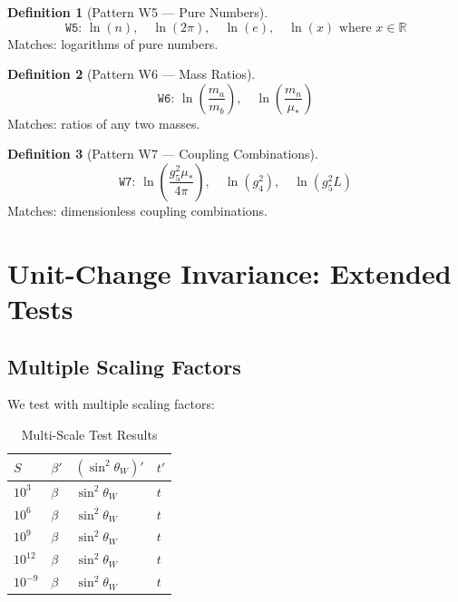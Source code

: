 \documentclass[11pt,a4paper]{article}
\theoremstyle{definition}
\newtheorem{definition}{Definition}[section]
\begin{document}
\begin{definition}[Pattern W5 — Pure Numbers]
\label{def:w5}
\begin{equation}
\label{eq:w5_regex}
\texttt{W5: } \ln(n), \quad \ln(2\pi), \quad \ln(e), \quad \ln(x) \text{ where } x \in \mathbb{R}
\end{equation}
Matches: logarithms of pure numbers.
\end{definition}

\begin{definition}[Pattern W6 — Mass Ratios]
\label{def:w6}
\begin{equation}
\label{eq:w6_regex}
\texttt{W6: } \ln\left(\frac{m_a}{m_b}\right), \quad \ln\left(\frac{m_n}{\mu_*}\right)
\end{equation}
Matches: ratios of any two masses.
\end{definition}

\begin{definition}[Pattern W7 — Coupling Combinations]
\label{def:w7}
\begin{equation}
\label{eq:w7_regex}
\texttt{W7: } \ln\left(\frac{g_5^2 \mu_*}{4\pi}\right), \quad \ln(g_4^2), \quad \ln(g_5^2 L)
\end{equation}
Matches: dimensionless coupling combinations.
\end{definition}

\section{Unit-Change Invariance: Extended Tests}
\label{app:unit_extended}

\subsection{Multiple Scaling Factors}
\label{subsec:multi_scale}

We test with multiple scaling factors:

\begin{table}[h]
\centering
\caption{Multi-Scale Test Results}
\label{tab:multi_scale}
\begin{tabular}{@{}llll@{}}
\toprule
\textbf{$S$} & \textbf{$\beta'$} & \textbf{$(\sin^2\theta_W)'$} & \textbf{$t'$} \\
\midrule
$10^3$ & $\beta$ & $\sin^2\theta_W$ & $t$ \\
$10^6$ & $\beta$ & $\sin^2\theta_W$ & $t$ \\
$10^9$ & $\beta$ & $\sin^2\theta_W$ & $t$ \\
$10^{12}$ & $\beta$ & $\sin^2\theta_W$ & $t$ \\
$10^{-9}$ & $\beta$ & $\sin^2\theta_W$ & $t$ \\
\bottomrule
\end{tabular}
\end{table}
\end{document}
